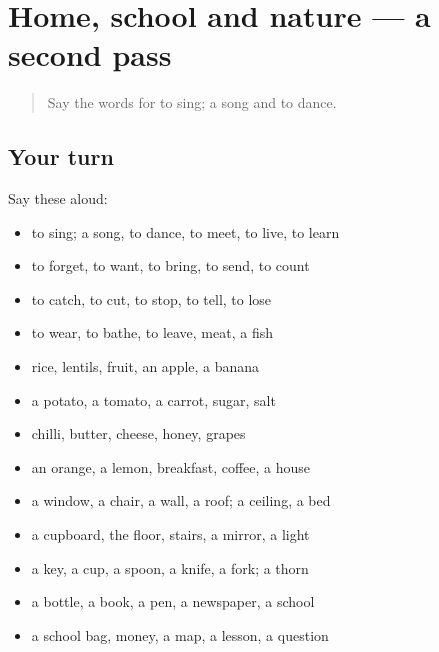 \section[(dialogue)]{Home, school and nature — a second pass}

\label{lesson:UR-R62-second-pass-home-school-and-nature}



\begin{quote}
Say the words for to sing; a song and to dance.
\end{quote}

\subsection*{Your turn}
Say these aloud:

\begin{itemize}
\raggedright
  \item to sing; a song, to dance, to meet, to live, to learn
  \item to forget, to want, to bring, to send, to count
  \item to catch, to cut, to stop, to tell, to lose
  \item to wear, to bathe, to leave, meat, a fish
  \item rice, lentils, fruit, an apple, a banana
  \item a potato, a tomato, a carrot, sugar, salt
  \item chilli, butter, cheese, honey, grapes
  \item an orange, a lemon, breakfast, coffee, a house
  \item a window, a chair, a wall, a roof; a ceiling, a bed
  \item a cupboard, the floor, stairs, a mirror, a light
  \item a key, a cup, a spoon, a knife, a fork; a thorn
  \item a bottle, a book, a pen, a newspaper, a school
  \item a school bag, money, a map, a lesson, a question
\end{itemize}

